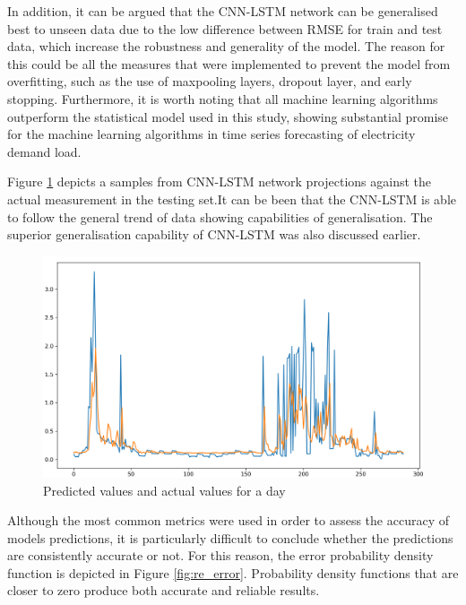\documentclass[twocolumn, a4paper,10pt]{article}
\begin{document}
In addition, it can be argued that the CNN-LSTM network can be generalised best to unseen data due to the low difference between RMSE for train and test data, which increase the robustness and generality of the model. The reason for this could be all the measures that were implemented to prevent the model from overfitting, such as the use of maxpooling layers, dropout layer, and early stopping. Furthermore, it is worth noting that all machine learning algorithms outperform the statistical model used in this study, showing substantial promise for the machine learning algorithms in time series forecasting of electricity demand load.

Figure \ref{fig:prediction} depicts a samples from CNN-LSTM network projections against the actual measurement in the testing set.It can be been that the CNN-LSTM is able to follow the general trend of data showing capabilities of generalisation. The superior generalisation capability of CNN-LSTM was also discussed earlier.

\begin{figure}[ht]
    \centering
    \includegraphics[scale=0.3]{img/test_day.png}
    \caption{Predicted values and actual values for a day}
    \label{fig:prediction}
\end{figure}

Although the most common metrics were used in order to assess the accuracy of models predictions, it is particularly difficult to conclude whether the predictions are consistently accurate or not. For this reason, the error probability density function is depicted in Figure \ref{fig:re_error}. Probability density functions that are closer to zero produce both accurate and reliable results.
\end{document}
